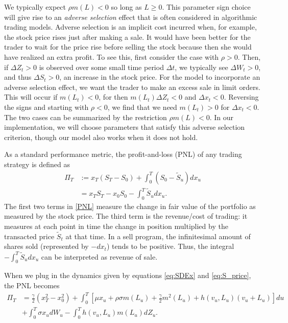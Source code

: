 \documentclass[12pt, letterpaper]{article}
\numberwithin{equation}{section}
\numberwithin{theorem}{section}
\begin{document}
We typically expect $\rho m(L)<0$ so long as $L\ge0$. This parameter sign choice will give rise to an \emph{adverse selection} effect that is often considered in algorithmic trading models. Adverse selection is an implicit cost incurred when, for example, the stock price rises just after making a sale. It would have been better for the trader to wait for the price rise before selling the stock because then she would have realized an extra profit. To see this, first consider the case with $\rho>0$. Then, if $\Delta Z_t>0$ is observed over some small time period $\Delta t$, we typically see $\Delta W_t>0$, and thus $\Delta S_t>0$, an increase in the stock price. For the model to incorporate an adverse selection effect, we want the trader to make an excess sale in limit orders. This will occur if $m(L_t)<0$, for then $m(L_t)\Delta Z_t<0$ and $\Delta x_t<0$. Reversing the signs and starting with $\rho<0$, we find that we need $m(L_t)>0$ for $\Delta x_t<0$. The two cases can be summarized by the restriction $\rho m(L)<0$. In our implementation, we will choose parameters that satisfy this adverse selection criterion, though our model also works when it does not hold. 

As a standard performance metric, the  profit-and-loss (PNL) of any trading strategy is defined as
\begin{align}
\Pi_T&:=x_T\left(S_T-S_0\right)+\int_0^T\left(S_0-\widetilde{S}_u\right)dx_u\\
&=x_T S_T-x_0 S_0-\int_0^T \widetilde{S}_u dx_u.\label{PNL}
\end{align}
The first two terms in  \eqref{PNL}   measure the change in fair value of the portfolio as measured by the stock  price. The third term is the revenue/cost of trading: it measures at each point in time the change in position multiplied by the transacted price $\widetilde{S}_t$ at that time. In a sell program, the infinitesimal amount of shares sold (represented by $-dx_t$) tends to be positive. Thus, the integral $-\int_0^T \widetilde{S}_u dx_u$ can be interpreted as revenue of sale. 

When we plug in the dynamics given by equations \eqref{eq:SDEx} and \eqref{eq:S_price}, the PNL becomes
\begin{equation}\label{eq:PNL_calculated}
\begin{aligned}
\Pi_T&=\frac{\gamma}{2}\left(x_T^2-x_0^2\right)+\int_0^T\left[\mu x_u+\rho\sigma m(L_u) +\frac{\gamma}{2}m^2(L_u)+h(v_u,L_u)(v_u+L_u)\right]du\\
&+\int_0^T \sigma x_u dW_u -\int_0^T h(v_u,L_u) m(L_u) dZ_u.
\end{aligned}
\end{equation}
\end{document}
